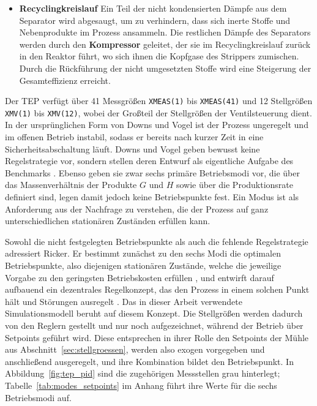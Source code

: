 \begin{itemize}
    \item \textbf{Recyclingkreislauf} \newline
    Ein Teil der nicht kondensierten Dämpfe aus dem Separator wird abgesaugt, um zu verhindern, dass sich inerte Stoffe und Nebenprodukte im Prozess ansammeln. Die restlichen Dämpfe des Separators werden durch den \textbf{Kompressor} geleitet, der sie im Recyclingkreislauf zurück in den Reaktor führt, wo sich ihnen die Kopfgase des Strippers zumischen. Durch die Rückführung der nicht umgesetzten Stoffe wird eine Steigerung der Gesamteffizienz erreicht.
\end{itemize}
%
Der \ac{TEP} verfügt über 41 Messgrößen \texttt{XMEAS(1)} bis \texttt{XMEAS(41)} und 12 Stellgrößen \texttt{XMV(1)} bis \texttt{XMV(12)}, wobei der Großteil der Stellgrößen der Ventilsteuerung dient. In der ursprünglichen Form von Downs und Vogel ist der Prozess ungeregelt und im offenen Betrieb instabil, sodass er bereits nach kurzer Zeit in eine Sicherheitsabschaltung läuft. Downs und Vogel geben bewusst keine Regelstrategie vor, sondern stellen deren Entwurf als eigentliche Aufgabe des Benchmarks \cite{downs.1993}. Ebenso geben sie zwar sechs primäre Betriebsmodi vor, die über das Massenverhältnis der Produkte $G$ und $H$ sowie über die Produktionsrate definiert sind, legen damit jedoch keine Betriebspunkte fest. Ein Modus ist als Anforderung aus der Nachfrage zu verstehen, die der Prozess auf ganz unterschiedlichen stationären Zuständen erfüllen kann. \par
%
Sowohl die nicht festgelegten Betriebspunkte als auch die fehlende Regelstrategie adressiert Ricker. Er bestimmt zunächst zu den sechs Modi die optimalen Betriebspunkte, also diejenigen stationären Zustände, welche die jeweilige Vorgabe zu den geringsten Betriebskosten erfüllen \cite{ricker.1995}, und entwirft darauf aufbauend ein dezentrales Regelkonzept, das den Prozess in einem solchen Punkt hält und Störungen ausregelt \cite{ricker.1996}. Das in dieser Arbeit verwendete Simulationsmodell beruht auf diesem Konzept. Die Stellgrößen werden dadurch von den Reglern gestellt und nur noch aufgezeichnet, während der Betrieb über Setpoints geführt wird. Diese entsprechen in ihrer Rolle den Setpoints der Mühle aus Abschnitt~\ref{sec:stellgroessen}, werden also exogen vorgegeben und anschließend ausgeregelt, und ihre Kombination bildet den Betriebspunkt. In Abbildung~\ref{fig:tep_pid} sind die zugehörigen Messstellen grau hinterlegt; Tabelle~\ref{tab:modes_setpoints} im Anhang führt ihre Werte für die sechs Betriebsmodi auf. \par
